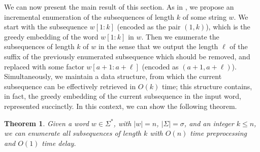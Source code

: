 \documentclass[10pt,a4paper]{amsart}
\theoremstyle{plain}
\newtheorem{theorem}{Theorem}
\theoremstyle{definition}
\begin{document}
We can now present the main result of this section. As in \cite{AdamsonGM24}, we propose an incremental enumeration of the subsequences of length $k$ of some string $w$. We start with the subsequence $w[1:k]$ (encoded as the pair $(1,k)$), which is the greedy embedding of the word $w[1:k]$ in $w$. Then we enumerate the subsequences of length $k$ of $w$ in the sense that we output the length $\ell$ of the suffix of the previously enumerated subsequence which should be removed, and replaced with some factor $w[a+1:a+\ell]$ (encoded as $(a+1,a+\ell)$). Simultaneously, we maintain a data structure, from which the current subsequence can be effectively retrieved in $O(k)$ time; this structure contains, in fact, the greedy embedding of the current subsequence in the input word, represented succinctly. In this context, we can show the following theorem.

\begin{theorem}
Given a word $w \in \Sigma^*$, with $|w|=n$, $|\Sigma|=\sigma$, and an integer $k \leq n$, we can enumerate all subsequences of length $k$ with $O(n )$ time preprocessing and $O(1)$ time delay.
\end{theorem}
\end{document}
